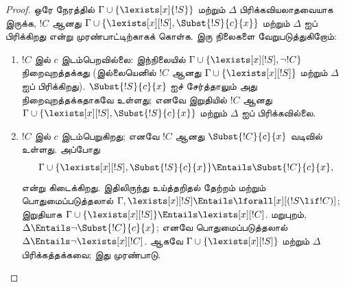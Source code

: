 \documentclass[../../../include/open-logic-section]{subfiles}
\begin{document}
\begin{proof}
ஒரே நேரத்தில் $\Gamma \cup \{\lexists[x]{!S} \}$ மற்றும் $\Delta$
பிரிக்கவியலாதவையாக இருக்க, $!C$ ஆனது
$\Gamma \cup \{
\lexists[x][!S], \Subst{!S}{c}{x}\}$ மற்றும் $\Delta$ ஐப் பிரிக்கிறது
என்று முரண்பாட்டிற்காகக் கொள்க. இரு நிலைகளை வேறுபடுத்துகிறோம்:
\begin{enumerate}
\item $!C$ இல் $c$ இடம்பெறவில்லை: இந்நிலையில்
$\Gamma \cup
  \{\lexists[x][!S], \lnot!C \}$ நிறைவுறத்தக்கது
(இல்லையெனில் $!C$ ஆனது $\Gamma \cup \{\lexists[x][!S] \}$ மற்றும்
$\Delta$ ஐப் பிரிக்கிறது). $\Subst{!S}{c}{x}$ ஐச் சேர்த்தாலும் அது
நிறைவுறத்தக்கதாகவே உள்ளது; எனவே இறுதியில் $!C$ ஆனது
$\Gamma \cup \{ \lexists[x][!S], \Subst{!S}{c}{x} \}$ மற்றும்
$\Delta$ ஐப் பிரிக்கவில்லை.
\item $!C$ இல் $c$ இடம்பெறுகிறது; எனவே $!C$ ஆனது
  $\Subst{!C}{c}{x}$ வடிவில் உள்ளது. அப்போது
  \[
  \Gamma \cup \{ \lexists[x][!S], \Subst{!S}{c}{x}\} \Entails \Subst{!C}{c}{x},
  \]
  என்று கிடைக்கிறது. இதிலிருந்து உய்த்தறிதல் தேற்றம் மற்றும்
  பொதுமைப்படுத்தலால்
  $\Gamma, \lexists[x][!S] \Entails \lforall[x][(!S \lif !C)]$;
  இறுதியாக $\Gamma
  \cup \{ \lexists[x][!S] \} \Entails \lexists[x][!C]$. மறுபுறம்,
  $\Delta \Entails \lnot \Subst{!C}{c}{x}$; எனவே
  பொதுமைப்படுத்தலால் $\Delta \Entails \lnot \lexists[x][!C]$.
  ஆகவே $\Gamma
  \cup \{\lexists[x][!S] \}$ மற்றும் $\Delta$ பிரிக்கத்தக்கவை;
  இது முரண்பாடு.
\end{enumerate}
\end{proof}
\end{document}
